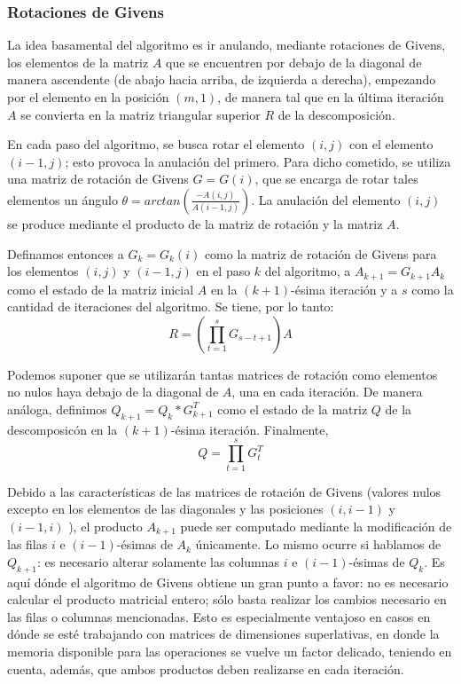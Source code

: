 \documentclass[journal, monochrome]{IEEEtran}
\begin{document}
\vspace{0.5cm}
\subsubsection{Rotaciones de Givens}
\par
La idea basamental del algoritmo es ir anulando, mediante rotaciones de Givens, los elementos de la matriz $A$ que se encuentren por debajo de la diagonal
de manera ascendente (de abajo hacia arriba, de izquierda a derecha), empezando por el elemento en la posición $(m,1)$, de manera
tal que en la última iteración $A$ se convierta en la matriz triangular superior $R$ de la descomposición.
\par
En cada paso del algoritmo, se busca rotar el elemento $(i,j)$ con el elemento $(i-1,j)$; esto provoca la anulación del primero.
Para dicho cometido, se utiliza una matriz de rotación de Givens $G = G(i)$, que se encarga de rotar tales elementos un
ángulo $\theta = arctan(\frac{-A(i,j)}{A(i-1,j)})$. La anulación del elemento $(i,j)$ se produce mediante el producto de la matriz de rotación y la matriz $A$.
\par
Definamos entonces a $G_k = G_k(i)$ como la matriz de rotación de Givens para los elementos $(i,j)$ y $(i-1,j)$ en el paso $k$ del algoritmo, a
$A_{k+1} = G_{k+1} A_k$ como el estado de la matriz inicial $A$ en la $(k+1)$-ésima iteración
y a $s$ como la cantidad de iteraciones del algoritmo. Se tiene, por lo tanto:
\begin{equation}
  R = (\displaystyle\prod_{t=1}^s G_{s-t+1}) A
\end{equation}

\par
Podemos suponer que se utilizarán tantas matrices de rotación como elementos no nulos haya debajo de la diagonal de $A$, una en cada iteración.
De manera análoga, definimos $Q_{k+1} = Q_k * G_{k+1}^T$ como el estado de la matriz $Q$ de la descomposicón en la $(k+1)$-ésima iteración. Finalmente,
\begin{equation}
Q = \displaystyle\prod_{t=1}^s G_{t}^T
\end{equation}

\par
Debido a las características de las matrices de rotación de Givens (valores nulos excepto en los elementos de las diagonales y las posiciones $(i, i-1)$ y $(i-1,i)$ ),
el producto $A_{k+1}$ puede ser computado mediante la modificación de las filas $i$ e $(i-1)$-ésimas de $A_k$ únicamente. Lo mismo ocurre si hablamos de $Q_{k+1}$: es necesario alterar
solamente las columnas $i$ e $(i-1)$-ésimas de $Q_{k}$. Es aquí dónde el algoritmo de Givens obtiene un gran punto a favor: no es necesario
calcular el producto matricial entero; sólo basta realizar los cambios necesario en las filas o columnas mencionadas. Esto es especialmente ventajoso
en casos en dónde se esté trabajando con matrices de dimensiones superlativas, en donde la memoria disponible para las operaciones se vuelve un factor delicado, teniendo
en cuenta, además, que ambos productos deben realizarse en cada iteración.
\end{document}
